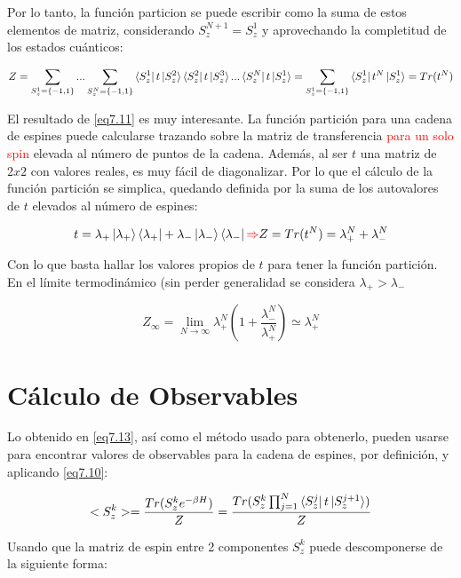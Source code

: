 \documentclass{book}
\begin{document}
Por lo tanto, la función particion se puede escribir como la suma de estos elementos de matriz, considerando $S_z^{N+1}=S_z^1$ y aprovechando la completitud de los estados cuánticos:

\begin{equation}\label{eq7.11}Z=\sum_{S^1_z=\{-1,1\}}...\sum_{S^N_z=\{-1,1\}}\bra{S^1_z}t\ket{S^2_z}\bra{S^2_z}t\ket{S^3_z}...\bra{S^N_z}t\ket{S^1_z}=\sum_{S^1_z=\{-1,1\}} \bra{S^1_z}t^N\ket{S^1_z}=Tr(t^N)\end{equation}

El resultado de \ref{eq7.11} es muy interesante. La función partición para una cadena de espines puede calcularse trazando sobre la matriz de transferencia \textcolor{red}{para un solo spin} elevada al número de puntos de la cadena. Además, al ser $t$ una matriz de $2x2$ con valores reales, es muy fácil de diagonalizar. Por lo que el cálculo de la función partición se simplica, quedando definida por la suma de los autovalores de $t$ elevados al número de espines:

\begin{equation}\label{eq7.12}t=\lambda_+\ket{\lambda_+}\bra{\lambda_+}+\lambda_-\ket{\lambda_-}\bra{\lambda_-}\textcolor{red}{\Rightarrow} Z= Tr(t^N)=\lambda_+^N+\lambda_-^N\end{equation}

Con lo que basta hallar los valores propios de $t$ para tener la función partición. En el límite termodinámico (sin perder generalidad se considera $\lambda_+>\lambda_-$

\begin{equation}\label{eq7.13}Z_\infty=\lim_{N\rightarrow\infty}\lambda_+^N(1+\frac{\lambda_-^N}{\lambda_+^N})\simeq \lambda_+^N\end{equation}
\section{Cálculo de Observables}
Lo obtenido en \ref{eq7.13}, así como el método usado para obtenerlo, pueden usarse para encontrar valores de observables para la cadena de espines, por definición, y aplicando \ref{eq7.10}:

\begin{equation}\label{eq7.14} <S^k_z>=\frac{Tr(S^k_z e^{-\beta H})}{Z}=\frac{Tr(S^k_z\prod_{j=1}^N \bra{S_z^j}t\ket{S_z^{j+1}})}{Z}\end{equation}

Usando que la matriz de espin entre 2 componentes $S_z^k$ puede descomponerse de la siguiente forma:
\end{document}
